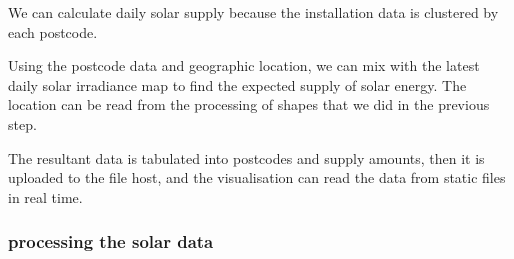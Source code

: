 \documentclass[12pt,a4paper]{report}
\begin{document}
We can calculate daily solar supply because the installation data is clustered by each postcode.

Using the postcode data and geographic location, we can mix with the latest daily solar irradiance map to find the expected supply of solar energy. The location can be read from the processing of shapes that we did in the previous step.

The resultant data is tabulated into postcodes and supply amounts, then it is uploaded to the file host, and the visualisation can read the data from static files in real time.
 
\subsubsection{processing the solar data}





%
\end{document}
